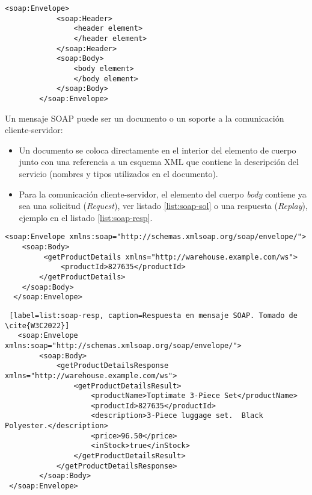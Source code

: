   
 	  \begin{lstlisting}[label=list:soap-est,caption=Estructura de mensaje SOAP]
 	 	<soap:Envelope>
 		 	<soap:Header>
 	 			<header element>
				</header element>
 	 		</soap:Header>
 	 		<soap:Body>
 	 			<body element>
 	 			</body element>
  	 		</soap:Body>
 	 	</soap:Envelope>
 	 \end{lstlisting} 
 	 
 	
 
 	  	 
 	 Un mensaje SOAP puede ser un documento o un soporte a la comunicación cliente-servidor:
 	\begin{itemize}
 		\item	Un documento  se coloca directamente en el interior del elemento de cuerpo  junto con una referencia a un esquema XML que contiene la descripción del servicio (nombres y tipos utilizados en el documento). 
 		\item Para la comunicación cliente-servidor, el elemento del cuerpo \textit{body} contiene ya sea una solicitud (\textit{Request}), ver listado \ref{list:soap-sol}  o una respuesta (\textit{Replay}), ejemplo en el listado \ref{list:soap-resp}.
 	\end{itemize}
 
 
 
   \begin{lstlisting}[label=list:soap-sol, caption=Solicitud en mensaje SOAP. Tomado de \cite{W3C2022}]  <soap:Envelope xmlns:soap="http://schemas.xmlsoap.org/soap/envelope/">
  	<soap:Body>
 		 <getProductDetails xmlns="http://warehouse.example.com/ws">
 			 <productId>827635</productId>
  		</getProductDetails>
	</soap:Body>
  </soap:Envelope>
 \end{lstlisting}
 
 
 
 
 \begin{lstlisting} [label=list:soap-resp, caption=Respuesta en mensaje SOAP. Tomado de \cite{W3C2022}]
   <soap:Envelope xmlns:soap="http://schemas.xmlsoap.org/soap/envelope/">
 		<soap:Body>
 			<getProductDetailsResponse xmlns="http://warehouse.example.com/ws">
 				<getProductDetailsResult>
 					<productName>Toptimate 3-Piece Set</productName>
					<productId>827635</productId>
 					<description>3-Piece luggage set.  Black Polyester.</description>
					<price>96.50</price>
 					<inStock>true</inStock>
 				</getProductDetailsResult>
 			</getProductDetailsResponse>
 		</soap:Body>
 </soap:Envelope>
\end{lstlisting}


